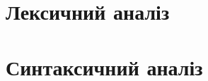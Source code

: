 \documentclass[a4paper, 12pt]{book}
\begin{document}
\tableofcontents %

\chapter{Лексичний аналіз}

 \newpage

 \newpage

 \newpage

 \newpage

 \newpage


\chapter{Синтаксичний аналіз}

 \newpage

 \newpage

 \newpage

 \newpage

 \newpage

 \newpage
\end{document}
